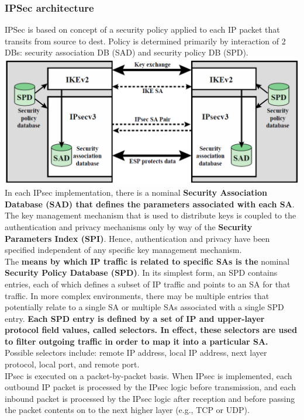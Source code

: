 \documentclass[12pt]{article}
\begin{document}
 \subsubsection{IPSec architecture}
 IPSec is based on concept of a security policy applied to each IP packet that transits from source to dest. Policy is determined primarily by interaction of 2 DBs: security association DB (SAD) and security policy DB (SPD).\\
 \includegraphics[width=\linewidth]{./slides/L6P5IPSECARCH.PNG}\\
 In each IPsec implementation, there is a nominal \textbf{Security Association Database (SAD) that defines the parameters associated with each SA}. The key management mechanism that is used to distribute keys is coupled to the authentication and privacy mechanisms only by way of the \textbf{Security Parameters Index (SPI)}. Hence, authentication and privacy have been specified independent of any specific key management mechanism.\\
 The \textbf{means by which IP traffic is related to specific SAs is the} nominal \textbf{Security Policy Database (SPD)}. In its simplest form, an SPD contains entries, each of which defines a subset of IP traffic and points to an SA for that traffic. In more complex environments, there may be multiple entries that potentially relate to a single SA or multiple SAs associated with a single SPD entry. \textbf{Each SPD entry is defined by a set of IP and upper-layer protocol field values, called selectors. In effect, these selectors are used to filter outgoing traffic in order to map it into a particular SA.} Possible selectors include: remote IP address, local IP address, next layer protocol, local port, and remote port.\\
 IPsec is executed on a packet-by-packet basis. When IPsec is implemented, each outbound IP packet is processed by the IPsec logic before transmission, and each inbound packet is processed by the IPsec logic after reception and before passing the packet contents on to the next higher layer (e.g., TCP or UDP).
 
\end{document}
